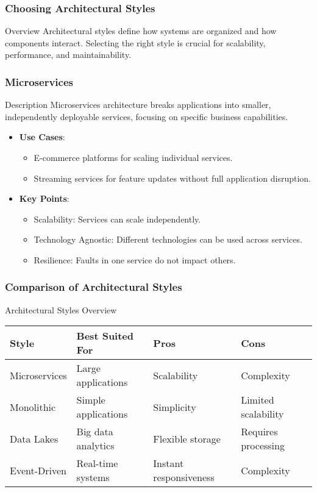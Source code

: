 \documentclass[aspectratio=169]{beamer}
\begin{document}
\begin{frame}[fragile]
    \frametitle{Choosing Architectural Styles}
    \begin{block}{Overview}
        Architectural styles define how systems are organized and how components interact. Selecting the right style is crucial for scalability, performance, and maintainability.
    \end{block}
\end{frame}

\begin{frame}[fragile]
    \frametitle{Microservices}
    \begin{block}{Description}
        Microservices architecture breaks applications into smaller, independently deployable services, focusing on specific business capabilities.
    \end{block}
    \begin{itemize}
        \item \textbf{Use Cases}:
        \begin{itemize}
            \item E-commerce platforms for scaling individual services.
            \item Streaming services for feature updates without full application disruption.
        \end{itemize}
        \item \textbf{Key Points}:
        \begin{itemize}
            \item Scalability: Services can scale independently.
            \item Technology Agnostic: Different technologies can be used across services.
            \item Resilience: Faults in one service do not impact others.
        \end{itemize}
    \end{itemize}
\end{frame}

\begin{frame}[fragile]
    \frametitle{Comparison of Architectural Styles}
    \begin{block}{Architectural Styles Overview}
        \begin{tabular}{|l|l|l|l|}
            \hline
            \textbf{Style} & \textbf{Best Suited For} & \textbf{Pros} & \textbf{Cons} \\
            \hline
            Microservices & Large applications & Scalability & Complexity \\
            \hline
            Monolithic & Simple applications & Simplicity & Limited scalability \\
            \hline
            Data Lakes & Big data analytics & Flexible storage & Requires processing \\
            \hline
            Event-Driven & Real-time systems & Instant responsiveness & Complexity \\
            \hline
        \end{tabular}
    \end{block}
\end{frame}
\end{document}
